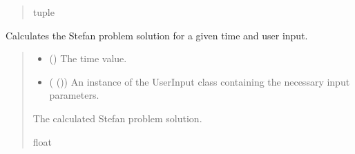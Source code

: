 \documentclass[a4paper,11pt,english,openany]{sphinxmanual}
\begin{document}
\begin{fulllineitems}
\begin{fulllineitems}
\begin{quote}
\begin{description}
\sphinxAtStartPar
tuple

\end{description}\end{quote}

\end{fulllineitems}


\begin{fulllineitems}
\label{\detokenize{api/spyice.models.stefan_problem:src.spyice.models.stefan_problem.StefanProblem.stefan_problem}}
\pysigstartsignatures
\pysiglinewithargsret
{}
{\sphinxparamcomma {}}
{}
\pysigstopsignatures
\sphinxAtStartPar
Calculates the Stefan problem solution for a given time and user input.
\begin{quote}\begin{description}
\begin{itemize}
\item {} 
\sphinxAtStartPar
{} () \textendash{} The time value.

\item {} 
\sphinxAtStartPar
{} ({\hyperref[\detokenize{api/spyice.parameters.user_input:src.spyice.parameters.user_input.UserInput}]{}} ()) \textendash{} An instance of the UserInput class containing the necessary input parameters.

\end{itemize}

\sphinxAtStartPar
The calculated Stefan problem solution.

\sphinxAtStartPar
float

\sphinxAtStartPar
{} \textendash{} 

\end{description}\end{quote}


\end{fulllineitems}
\end{fulllineitems}
\end{document}
